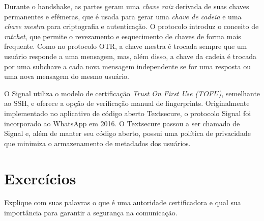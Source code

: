 Durante o handshake, as partes geram uma {\em chave raiz} derivada de suas chaves permanentes e efêmeras, que é usada para gerar uma {\em chave de cadeia} e uma {\em chave mestra} para criptografia e autenticação.
O protocolo introduz o conceito de \textit{ratchet}, que permite o revezamento e esquecimento de chaves de forma mais frequente.
Como no protocolo OTR, a chave mestra é trocada sempre que um usuário responde a uma mensagem, mas, além disso, a chave da cadeia é trocada por uma subchave a cada nova mensagem independente se for uma resposta ou uma nova mensagem do mesmo usuário.

O Signal utiliza o modelo de certificação \textit{Trust On First Use (TOFU)}, semelhante ao SSH, e oferece a opção de verificação manual de fingerprints.
Originalmente implementado no aplicativo de código aberto Textsecure, o protocolo Signal foi incorporado ao WhatsApp em 2016.
O Textsecure passou a ser chamado de Signal e, além de manter seu código aberto, possui uma política de privacidade que minimiza o armazenamento de metadados dos usuários.

\section{Exercícios}


\begin{exercicio}
  Explique com suas palavras o que é uma autoridade certificadora e qual sua importância para garantir a segurança na comunicação.
\end{exercicio}
